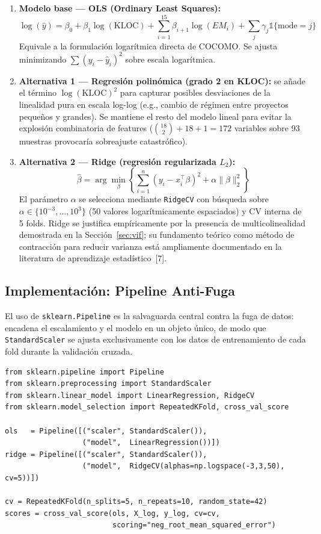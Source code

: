 \documentclass[11pt,a4paper]{article}
\begin{document}
\begin{enumerate}[itemsep=4pt,leftmargin=1.5em]
\item \textbf{Modelo base --- OLS (Ordinary Least Squares):}
\[
\log(\hat{y}) = \beta_0 + \beta_1 \log(\mathrm{KLOC}) + \sum_{i=1}^{15} \beta_{i+1} \log(EM_i) + \sum_{j} \gamma_j \mathbb{1}\{\mathrm{mode}=j\}
\]
Equivale a la formulación logarítmica directa de COCOMO. Se ajusta minimizando $\sum (y_i - \hat{y}_i)^2$ sobre escala logarítmica.

\item \textbf{Alternativa 1 --- Regresión polinómica (grado 2 en KLOC):} se añade el término $\log(\mathrm{KLOC})^2$ para capturar posibles desviaciones de la linealidad pura en escala log-log (e.g., cambio de régimen entre proyectos pequeños y grandes). Se mantiene el resto del modelo lineal para evitar la explosión combinatoria de features ($\binom{18}{2}+18+1=172$ variables sobre 93 muestras provocaría sobreajuste catastrófico).

\item \textbf{Alternativa 2 --- Ridge (regresión regularizada $L_2$):}
\[
\hat{\beta} = \arg\min_{\beta} \left\{ \sum_{i=1}^{n}(y_i - x_i^\top \beta)^2 + \alpha \|\beta\|_2^2 \right\}
\]
El parámetro $\alpha$ se selecciona mediante \texttt{RidgeCV} con búsqueda sobre $\alpha \in \{10^{-3}, \ldots, 10^{3}\}$ (50 valores logarítmicamente espaciados) y CV interna de 5 folds. Ridge se justifica empíricamente por la presencia de multicolinealidad demostrada en la Sección~\ref{sec:vif}; su fundamento teórico como método de contracción para reducir varianza está ampliamente documentado en la literatura de aprendizaje estadístico~[7].
\end{enumerate}

\subsection{Implementación: Pipeline Anti-Fuga}

El uso de \texttt{sklearn.Pipeline} es la salvaguarda central contra la fuga de datos: encadena el escalamiento y el modelo en un objeto único, de modo que \texttt{StandardScaler} se ajusta exclusivamente con los datos de entrenamiento de cada fold durante la validación cruzada.

\begin{lstlisting}[caption={Pipeline sklearn que aplica escalamiento dentro de cada fold de CV},label={lst:pipeline}]
from sklearn.pipeline import Pipeline
from sklearn.preprocessing import StandardScaler
from sklearn.linear_model import LinearRegression, RidgeCV
from sklearn.model_selection import RepeatedKFold, cross_val_score

ols   = Pipeline([("scaler", StandardScaler()),
                  ("model",  LinearRegression())])
ridge = Pipeline([("scaler", StandardScaler()),
                  ("model",  RidgeCV(alphas=np.logspace(-3,3,50), cv=5))])

cv = RepeatedKFold(n_splits=5, n_repeats=10, random_state=42)
scores = cross_val_score(ols, X_log, y_log, cv=cv,
                         scoring="neg_root_mean_squared_error")
\end{lstlisting}
\end{document}
